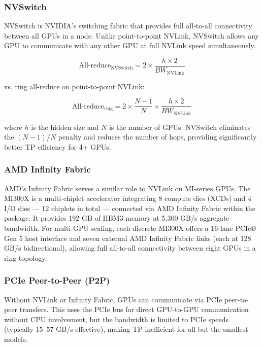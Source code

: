 \documentclass[11pt,a4paper]{article}
\theoremstyle{definition}
\begin{document}
\subsubsection{NVSwitch}

NVSwitch is NVIDIA's switching fabric that provides full all-to-all connectivity between all GPUs in a node. Unlike point-to-point NVLink, NVSwitch allows any GPU to communicate with any other GPU at full NVLink speed simultaneously.

\begin{equation}\label{eq:nvswitch_ar}
\text{All-reduce}_{\text{NVSwitch}} = 2 \times \frac{h \times 2}{BW_{\text{NVLink}}}
\end{equation}

vs. ring all-reduce on point-to-point NVLink:

\begin{equation}\label{eq:ring_ar}
\text{All-reduce}_{\text{ring}} = 2 \times \frac{N-1}{N} \times \frac{h \times 2}{BW_{\text{NVLink}}}
\end{equation}

where $h$ is the hidden size and $N$ is the number of GPUs. NVSwitch eliminates the $(N-1)/N$ penalty and reduces the number of hops, providing significantly better TP efficiency for 4+ GPUs.

\subsubsection{AMD Infinity Fabric}

AMD's Infinity Fabric serves a similar role to NVLink on MI-series GPUs. The MI300X is a multi-chiplet accelerator integrating 8 compute dies (XCDs) and 4 I/O dies — 12 chiplets in total — connected via AMD Infinity Fabric within the package. It provides 192 GB of HBM3 memory at 5,300 GB/s aggregate bandwidth. For multi-GPU scaling, each discrete MI300X offers a 16-lane PCIe® Gen 5 host interface and seven external AMD Infinity Fabric links (each at 128 GB/s bidirectional), allowing full all-to-all connectivity between eight GPUs in a ring topology.

\subsubsection{PCIe Peer-to-Peer (P2P)}

Without NVLink or Infinity Fabric, GPUs can communicate via PCIe peer-to-peer transfers. This uses the PCIe bus for direct GPU-to-GPU communication without CPU involvement, but the bandwidth is limited to PCIe speeds (typically 15--57 GB/s effective), making TP inefficient for all but the smallest models.
\end{document}
